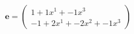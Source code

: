 \documentclass[preview]{standalone}
\begin{document}
\begin{align*}
\mathbf{e} = \begin{pmatrix}1 + 1x^{1} + -1x^{3} \\ -1 + 2x^{1} + -2x^{2} + -1x^{3}\end{pmatrix}
\end{align*}
\end{document}
